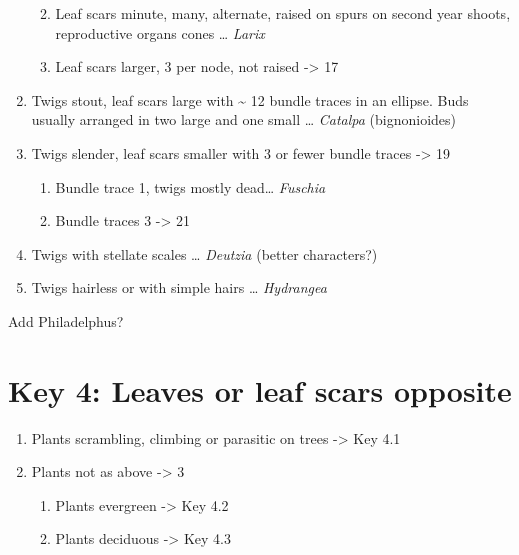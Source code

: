 \documentclass[openany]{book}
\providecommand{\tightlist}{%
  \setlength{\itemsep}{0pt}\setlength{\parskip}{0pt}}
\begin{document}
\begin{enumerate}
  \begin{enumerate}
  \def\labelenumii{\arabic{enumii}.}
  \setcounter{enumii}{14}
  \tightlist
  \item
    Leaf scars minute, many, alternate, raised on spurs on second year
    shoots, reproductive organs cones \ldots{} \emph{Larix}
  \item
    Leaf scars larger, 3 per node, not raised -\textgreater{} 17
  \end{enumerate}
\item
  Twigs stout, leaf scars large with \textasciitilde{} 12 bundle traces
  in an ellipse. Buds usually arranged in two large and one small
  \ldots{} \emph{Catalpa} (bignonioides)
\item
  Twigs slender, leaf scars smaller with 3 or fewer bundle traces
  -\textgreater{} 19

  \begin{enumerate}
  \def\labelenumii{\arabic{enumii}.}
  \setcounter{enumii}{18}
  \tightlist
  \item
    Bundle trace 1, twigs mostly dead\ldots{} \emph{Fuschia}
  \item
    Bundle traces 3 -\textgreater{} 21
  \end{enumerate}
\item
  Twigs with stellate scales \ldots{} \emph{Deutzia} (better
  characters?)
\item
  Twigs hairless or with simple hairs \ldots{} \emph{Hydrangea}
\end{enumerate}

Add Philadelphus?

\hypertarget{key-4-leaves-or-leaf-scars-opposite}{%
\section{Key 4: Leaves or leaf scars
opposite}\label{key-4-leaves-or-leaf-scars-opposite}}

\begin{enumerate}
\def\labelenumi{\arabic{enumi}.}
\tightlist
\item
  Plants scrambling, climbing or parasitic on trees -\textgreater{} Key
  4.1
\item
  Plants not as above -\textgreater{} 3

  \begin{enumerate}
  \def\labelenumii{\arabic{enumii}.}
  \setcounter{enumii}{2}
  \tightlist
  \item
    Plants evergreen -\textgreater{} Key 4.2
  \item
    Plants deciduous -\textgreater{} Key 4.3
  \end{enumerate}
\end{enumerate}
\end{document}
